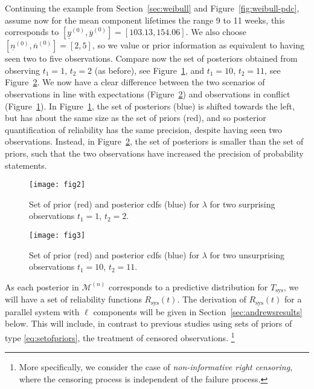 \documentclass[12pt,a4paper,twocolumn,fleqn]{narms}
\newcommand{\uz}{^{(0)}} %
\newcommand{\un}{^{(n)}} %
\newcommand{\ul}[1]{\underline{#1}}
\newcommand{\ol}[1]{\overline{#1}}
\def\yzl{\ul{y}\uz}
\def\yzu{\ol{y}\uz}
\def\nzl{\ul{n}\uz}
\def\nzu{\ol{n}\uz}
\def\MN{\mathcal{M}\un}
\newcommand{\comments}[1]{{\small\color{gray} #1}}
\begin{document}
Continuing the example from Section~\ref{sec:weibull} and Figure~\ref{fig:weibull-pdc},
assume now for the mean component lifetimes the range 9 to 11 weeks,
this corresponds to $[\yzl,\yzu] = [103.13, 154.06]$.
We also choose $[\nzl,\nzu] =[2, 5]$,
so we value or prior information as equivalent to having seen two to five observations.
Compare now the set of posteriors obtained from observing
$t_1 = 1$, $t_2 = 2$ (as before), see Figure~\ref{fig:setofpost-pdc},
and $t_1 = 10$, $t_2 = 11$, see Figure~\ref{fig:setofpost-nopdc}.
We now have a clear difference between the two scenarios of
observations in line with expectations (Figure~\ref{fig:setofpost-nopdc})
and observations in conflict (Figure~\ref{fig:setofpost-pdc}).
In Figure~\ref{fig:setofpost-pdc}, the set of posteriors (blue)
is shifted towards the left, but has about the same size as the set of priors (red),
and so posterior quantification of reliability has the same precision,
despite having seen two observations.
Instead, in Figure~\ref{fig:setofpost-nopdc}, the set of posteriors
is smaller than the set of priors,
such that the two observations have increased the precision of probability statements.

\begin{figure}
\texttt{[image: fig2]}
\caption{Set of prior (red) and posterior cdfs (blue) for $\lambda$ for two surprising observations $t_1 = 1$, $t_2 = 2$.}
\label{fig:setofpost-pdc}
\end{figure}

\begin{figure}
\texttt{[image: fig3]}
\caption{Set of prior (red) and posterior cdfs (blue) for $\lambda$ for two unsurprising observations $t_1 = 10$, $t_2 = 11$.}
\label{fig:setofpost-nopdc}
\end{figure}

%
As each posterior in $\MN$ corresponds to a predictive distribution for $T_\text{sys}$,
we will have a set of reliability functions $R_\text{sys}(t)$.
The derivation of $R_\text{sys}(t)$ for a parallel system with $\ell$ components
will be given in Section~\ref{sec:andrewsresults} below.
This will include, in contrast to previous studies using sets of priors of type 
\eqref{eq:setofpriors}, the treatment of censored observations.%
\footnote{More specifically, we consider the case of \emph{non-informative right censoring},
where the censoring process is independent of the failure process.}
\end{document}
